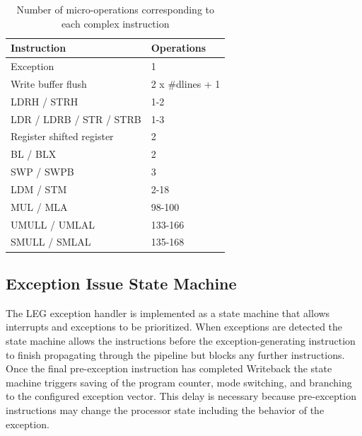 \begin{table}[h!]
\centering
\begin{tabular}{|l|l|}
\hline
\textbf{Instruction} & \textbf{Operations}\\
\hline
Exception & 1\\
\hline
Write buffer flush & 2 x \#dlines + 1\\
\hline
LDRH / STRH & 1-2\\
\hline
LDR / LDRB / STR / STRB & 1-3\\
\hline
Register shifted register & 2\\
\hline
BL / BLX & 2\\
\hline
SWP / SWPB & 3\\
\hline
LDM / STM & 2-18\\
\hline
MUL / MLA & 98-100\\
\hline
UMULL / UMLAL & 133-166\\
\hline
SMULL / SMLAL & 135-168\\
\hline
\end{tabular}
\caption{Number of micro-operations corresponding to each complex instruction}
\label{table:uops}
\end{table}



\subsection{Exception Issue State Machine}

The LEG exception handler is implemented as a state machine that allows interrupts and exceptions to be prioritized. 
When exceptions are detected the state machine allows the instructions before the exception-generating instruction to finish propagating through the pipeline but blocks any further instructions. 
Once the final pre-exception instruction has completed Writeback the state machine triggers saving of the program counter, mode switching, and branching to the configured exception vector.
This delay is necessary because pre-exception instructions may change the processor state including the behavior of the exception.
